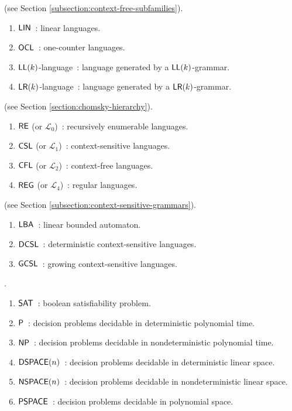 
 (see Section \ref{subsection:context-free-subfamilies}).

\begin{enumerate}[]
\item $\textup{\sf LIN}$\ : linear languages.
\item $\textup{\sf OCL}$\ : one-counter languages.
\item $\textup{\sf LL}(k)$-language\ : language generated by a $\textup{\sf LL}(k)$-grammar.
\item $\textup{\sf LR}(k)$-language\ : language generated by a $\textup{\sf LR}(k)$-grammar.
\end{enumerate}

 (see Section \ref{section:chomsky-hierarchy}).

\begin{enumerate}[]
\item $\textup{\sf RE}$ (or $\mathcal{L}_0$)\ : recursively enumerable languages.
\item $\textup{\sf CSL}$ (or $\mathcal{L}_1$)\ : context-sensitive languages.
\item $\textup{\sf CFL}$ (or $\mathcal{L}_2$)\ : context-free languages.
\item $\textup{\sf REG}$ (or $\mathcal{L}_4$)\ : regular languages.
\end{enumerate}

 (see Section \ref{subsection:context-sensitive-grammars}).

\begin{enumerate}[]
\item $\textup{\sf LBA}$\ : linear bounded automaton.
\item $\textup{\sf DCSL}$\ : deterministic context-sensitive languages.
\item $\textup{\sf GCSL}$\ : growing context-sensitive languages.
\end{enumerate}

.

\begin{enumerate}[]
\item $\textup{\sf SAT}$\ : boolean satisfiability problem.
\item $\textup{\sf P}$\ : decision problems decidable in deterministic polynomial time.
\item $\textup{\sf NP}$\ : decision problems decidable in nondeterministic polynomial time.
\item $\textup{\sf DSPACE}(n)$\ : decision problems decidable in deterministic linear space.
\item $\textup{\sf NSPACE}(n)$\ : decision problems decidable in nondeterministic linear space.
\item $\textup{\sf PSPACE}$\ : decision problems decidable in polynomial space.
\end{enumerate}

